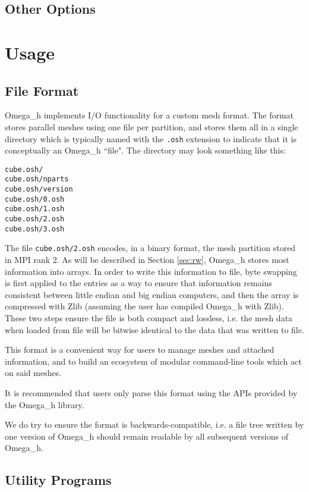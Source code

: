 \documentclass{article}
\begin{document}
\subsection{Other Options}

\section{Usage}

\subsection{File Format}

Omega\_h implements I/O functionality for a custom mesh format.
The format stores parallel meshes using one file per partition,
and stores them all in a single directory which is typically named
with the \texttt{.osh} extension to indicate that it is conceptually
an Omega\_h ``file".
The directory may look something like this:
\begin{verbatim}
cube.osh/
cube.osh/nparts
cube.osh/version
cube.osh/0.osh
cube.osh/1.osh
cube.osh/2.osh
cube.osh/3.osh
\end{verbatim}
The file \texttt{cube.osh/2.osh} encodes, in a binary format, the
mesh partition stored in MPI rank 2.
As will be described in Section \ref{sec:rw}, Omega\_h stores most
information into arrays.
In order to write this information to file, byte swapping is first
applied to the entries as a way to ensure that information remains
consistent between little endian and big endian computers,
and then the array is compressed with Zlib (assuming the user has
compiled Omega\_h with Zlib).
These two steps ensure the file is both compact and lossless, i.e.
the mesh data when loaded from file will be bitwise identical to
the data that was written to file.

This format is a convenient way for users to manage meshes and attached
information, and to build an ecosystem of modular command-line tools
which act on said meshes.

It is recommended that users only parse this format using
the APIs provided by the Omega\_h library.

We do try to ensure the format is backwards-compatible, i.e.
a file tree written by one version of Omega\_h should remain readable
by all subsequent versions of Omega\_h.

\subsection{Utility Programs}
\end{document}
